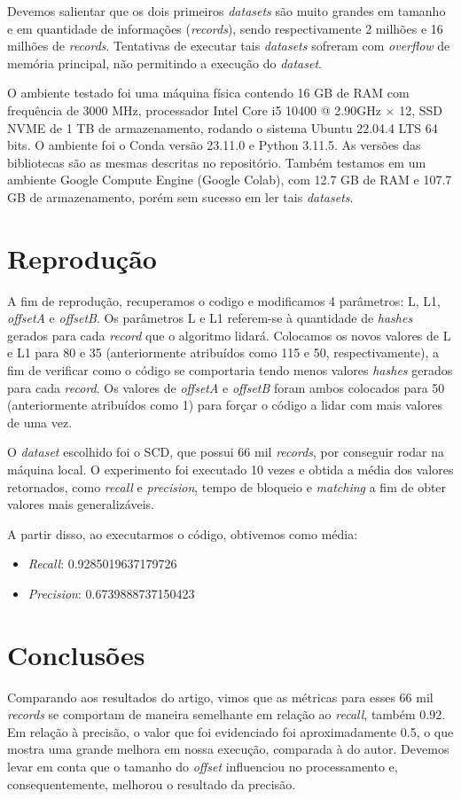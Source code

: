 \documentclass{article}
\begin{document}
Devemos salientar que os dois primeiros \emph{datasets} são muito grandes em tamanho e em quantidade de informações (\emph{records}), sendo respectivamente 2 milhões e 16 milhões de \emph{records}. Tentativas de executar tais \emph{datasets} sofreram com \emph{overflow} de memória principal, não permitindo a execução do \emph{dataset}.

O ambiente testado foi uma máquina física contendo 16 GB de RAM com frequência de 3000 MHz, processador Intel Core i5 10400 @ 2.90GHz × 12, SSD NVME de 1 TB de armazenamento, rodando o sistema Ubuntu 22.04.4 LTS 64 bits. O ambiente foi o Conda versão 23.11.0 e Python 3.11.5. As versões das bibliotecas são as mesmas descritas no repositório. Também testamos em um ambiente Google Compute Engine (Google Colab), com 12.7 GB de RAM e 107.7 GB de armazenamento, porém sem sucesso em ler tais \emph{datasets}.

\section{Reprodução}
A fim de reprodução, recuperamos o codigo e modificamos 4 parâmetros: L, L1, \emph{offsetA} e \emph{offsetB}. Os parâmetros L e L1 referem-se à quantidade de \emph{hashes} gerados para cada \emph{record} que o algoritmo lidará. Colocamos os novos valores de L e L1 para 80 e 35 (anteriormente atribuídos como 115 e 50, respectivamente), a fim de verificar como o código se comportaria tendo menos valores \emph{hashes} gerados para cada \emph{record}. Os valores de \emph{offsetA} e \emph{offsetB} foram ambos colocados para 50 (anteriormente atribuídos como 1) para forçar o código a lidar com mais valores de uma vez.

O \emph{dataset} escolhido foi o SCD, que possui 66 mil \emph{records}, por conseguir rodar na máquina local. O experimento foi executado 10 vezes e obtida a média dos valores retornados, como \emph{recall} e \emph{precision}, tempo de bloqueio e \emph{matching} a fim de obter valores mais generalizáveis.

A partir disso, ao executarmos o código, obtivemos como média:
\begin{itemize}
    \item \emph{Recall}: 0.9285019637179726
    \item \emph{Precision}: 0.6739888737150423
\end{itemize}

\section{Conclusões}
Comparando aos resultados do artigo, vimos que as métricas para esses 66 mil \emph{records} se comportam de maneira semelhante em relação ao \emph{recall}, também 0.92. Em relação à precisão, o valor que foi evidenciado foi aproximadamente 0.5, o que mostra uma grande melhora em nossa execução, comparada à do autor. Devemos levar em conta que o tamanho do \emph{offset} influenciou no processamento e, consequentemente, melhorou o resultado da precisão.
\end{document}
